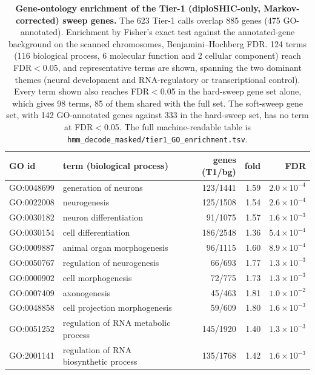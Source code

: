 \documentclass[11pt]{article}
\begin{document}




\begin{table}[h]\centering
  \caption{\textbf{Gene-ontology enrichment of the Tier-1 (diploSHIC-only, Markov-corrected) sweep genes.}
    The 623 Tier-1 calls overlap 885 genes (475 GO-annotated). Enrichment by Fisher's exact test against the
    annotated-gene background on the scanned chromosomes, Benjamini--Hochberg FDR. 124 terms (116 biological process, 6
    molecular function and 2 cellular component) reach FDR$<$0.05, and representative terms are shown, spanning the two dominant themes (neural development and RNA-regulatory or transcriptional control). Every term shown also reaches FDR$<$0.05 in the hard-sweep gene set alone, which gives 98 terms, 85 of them shared with the full set. The soft-sweep gene set, with 142 GO-annotated genes against 333 in the hard-sweep set,
    has no term at FDR$<$0.05. The full machine-readable table is \texttt{hmm\_decode\_masked/tier1\_GO\_enrichment.tsv}.}
  \label{stab:goenrich}
  \begin{tabular}{llrrr}
    \toprule
    GO id & term (biological process) & genes (T1/bg) & fold & FDR \\
    \midrule
    GO:0048699 & generation of neurons & 123/1441 & 1.59 & $2.0\times10^{-4}$ \\
    GO:0022008 & neurogenesis & 125/1508 & 1.54 & $2.6\times10^{-4}$ \\
    GO:0030182 & neuron differentiation & 91/1075 & 1.57 & $1.6\times10^{-3}$ \\
    GO:0030154 & cell differentiation & 186/2548 & 1.36 & $5.4\times10^{-4}$ \\
    GO:0009887 & animal organ morphogenesis & 96/1115 & 1.60 & $8.9\times10^{-4}$ \\
    GO:0050767 & regulation of neurogenesis & 66/693 & 1.77 & $1.3\times10^{-3}$ \\
    GO:0000902 & cell morphogenesis & 72/775 & 1.73 & $1.3\times10^{-3}$ \\
    GO:0007409 & axonogenesis & 45/463 & 1.81 & $1.0\times10^{-2}$ \\
    GO:0048858 & cell projection morphogenesis & 59/609 & 1.80 & $1.6\times10^{-3}$ \\
    GO:0051252 & regulation of RNA metabolic process & 145/1920 & 1.40 & $1.3\times10^{-3}$ \\
    GO:2001141 & regulation of RNA biosynthetic process & 135/1768 & 1.42 & $1.6\times10^{-3}$ \\
    \bottomrule
  \end{tabular}
\end{table}
\end{document}
